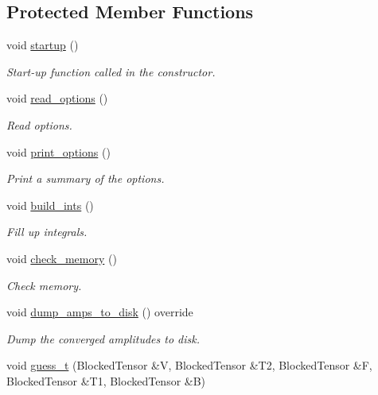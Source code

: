 \subsection*{Protected Member Functions}
\begin{DoxyCompactItemize}
\item 
void \mbox{\hyperlink{classforte_1_1_s_a___m_r_d_s_r_g_af82b0ce6ac08088272b2081ded5a8fdc}{startup}} ()
\begin{DoxyCompactList}\small\item\em Start-\/up function called in the constructor. \end{DoxyCompactList}\item 
void \mbox{\hyperlink{classforte_1_1_s_a___m_r_d_s_r_g_adf264fcf6a901079708422ec7be345f5}{read\+\_\+options}} ()
\begin{DoxyCompactList}\small\item\em Read options. \end{DoxyCompactList}\item 
void \mbox{\hyperlink{classforte_1_1_s_a___m_r_d_s_r_g_ac9a6efc1f4849a5842463119054bd339}{print\+\_\+options}} ()
\begin{DoxyCompactList}\small\item\em Print a summary of the options. \end{DoxyCompactList}\item 
void \mbox{\hyperlink{classforte_1_1_s_a___m_r_d_s_r_g_aa5abe34ba442283a14582ae5cff4a076}{build\+\_\+ints}} ()
\begin{DoxyCompactList}\small\item\em Fill up integrals. \end{DoxyCompactList}\item 
void \mbox{\hyperlink{classforte_1_1_s_a___m_r_d_s_r_g_ad093a045c517aa183cfe36a6886caeb6}{check\+\_\+memory}} ()
\begin{DoxyCompactList}\small\item\em Check memory. \end{DoxyCompactList}\item 
void \mbox{\hyperlink{classforte_1_1_s_a___m_r_d_s_r_g_a53d329b17db498bf6c3e6c3984195bcb}{dump\+\_\+amps\+\_\+to\+\_\+disk}} () override
\begin{DoxyCompactList}\small\item\em Dump the converged amplitudes to disk. \end{DoxyCompactList}\item 
void \mbox{\hyperlink{classforte_1_1_s_a___m_r_d_s_r_g_a68cda5896b0931d0be1cbc4f6ca521d2}{guess\+\_\+t}} (Blocked\+Tensor \&V, Blocked\+Tensor \&T2, Blocked\+Tensor \&F, Blocked\+Tensor \&T1, Blocked\+Tensor \&B)

\end{DoxyCompactItemize}
